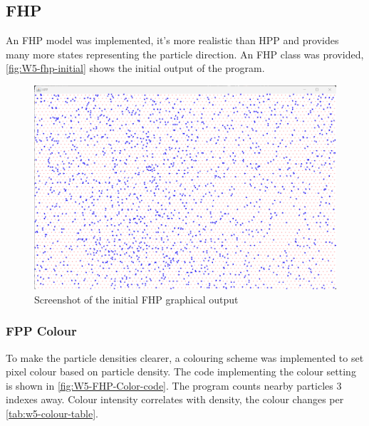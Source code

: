 \subsection{FHP}
An FHP model was implemented, it's more realistic than HPP and provides many more states representing the particle direction. An FHP class was provided, \autoref{fig:W5-fhp-initial} shows the initial output of the program.


\begin{figure}[H] 
    \centering
    \includegraphics[width=0.9\columnwidth]{Figures/Week 5/FHP Initial Run .png}
    \caption{Screenshot of the initial FHP graphical output}
    \label{fig:W5-fhp-initial}
\end{figure}

\subsubsection{FPP Colour}
To make the particle densities clearer, a colouring scheme was implemented to set pixel colour based on particle density. The code implementing the colour setting is shown in \autoref{fig:W5-FHP-Color-code}. The program counts nearby particles 3 indexes away. Colour intensity correlates with density, the colour changes per \autoref{tab:w5-colour-table}. 

